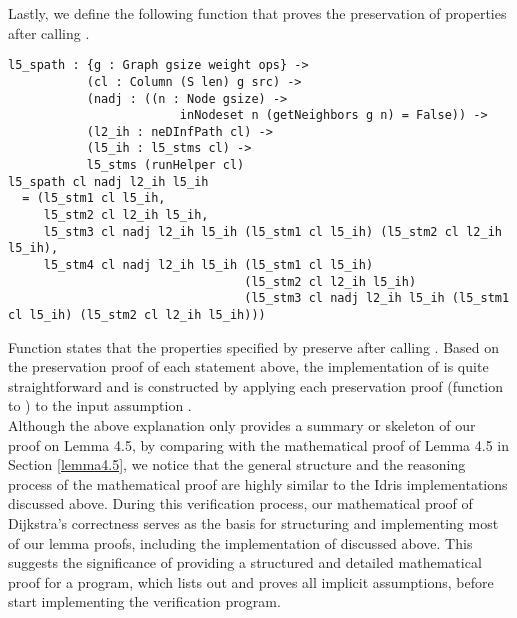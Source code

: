 Lastly, we define the following  function that proves the preservation of  properties after calling . 
\begin{lstlisting}
l5_spath : {g : Graph gsize weight ops} ->
           (cl : Column (S len) g src) ->
           (nadj : ((n : Node gsize) -> 
           				inNodeset n (getNeighbors g n) = False)) ->
           (l2_ih : neDInfPath cl) ->
           (l5_ih : l5_stms cl) ->
           l5_stms (runHelper cl)
l5_spath cl nadj l2_ih l5_ih
  = (l5_stm1 cl l5_ih,
     l5_stm2 cl l2_ih l5_ih,
     l5_stm3 cl nadj l2_ih l5_ih (l5_stm1 cl l5_ih) (l5_stm2 cl l2_ih l5_ih),
     l5_stm4 cl nadj l2_ih l5_ih (l5_stm1 cl l5_ih)
                                 (l5_stm2 cl l2_ih l5_ih)
                                 (l5_stm3 cl nadj l2_ih l5_ih (l5_stm1 cl l5_ih) (l5_stm2 cl l2_ih l5_ih)))
\end{lstlisting}

Function  states that the properties specified by  preserve after calling . Based on the preservation proof of each statement above, the implementation of  is quite straightforward and is constructed by applying each preservation proof (function  to ) to the input assumption .  
\\

Although the above explanation only provides a summary or skeleton of our proof on Lemma 4.5, by comparing with the mathematical proof of Lemma 4.5 in Section \ref{lemma4.5}, we notice that the general structure and the reasoning process of the mathematical proof are highly similar to the Idris implementations discussed above. During this verification process, our mathematical proof of Dijkstra's correctness serves as the basis for structuring and implementing most of our lemma proofs, including the implementation of  discussed above. This suggests the significance of providing a structured and detailed mathematical proof for a program, which lists out and proves all implicit assumptions, before start implementing the verification program. 
\\

